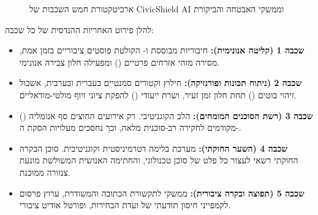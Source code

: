 \begin{figure}[htbp]
\begin{tikzhebrew}
\end{tikzhebrew}
\caption{ארכיטקטורת חמש השכבות של CivicShield AI וממשקי האבטחה והביקורת}
\label{fig:five_layer_arch}
\end{figure}

להלן פירוט האחריות ההנדסית של כל שכבה:
\begin{itemize}
    \item \textbf{שכבה 1 (קליטה אנונימית):} חיבוריות מבוססת  ו- הקולטת פוסטים ציבוריים בזמן אמת, מסירה מזהי אזרחים פרטיים () ומפעילה חלון צבירה אנונימי.
    \item \textbf{שכבה 2 (ניתוח תכונות ופורנזיקה):} חילוץ וקטורים סמנטיים בעברית ובערבית, אשכול זיהוי בוטים () תחת חלון זמן זעיר, ושרת ייעודי () להפקת ציוני זיוף מולטי-מודאליים.
    \item \textbf{שכבה 3 (רשת הסוכנים המומחים):} הלב הקוגניטיבי. רק אירועים החוצים סף אנומליה () מקודמים לחקירה רב-סוכנית מלאה, וכך נחסכים  מעלויות הסקת ה-.
    \item \textbf{שכבה 4 (השער החוקתי):} מערכת בלימה דטרמיניסטית וקוגניטיבית. סוכן הבקרה החוקתי רשאי לעצור כל פלט של סוכן טכנולוגי, והחתימה האנושית המשולשת מונעת צנזורה ממוכנת.
    \item \textbf{שכבה 5 (תפוצה ובקרה ציבורית):} ממשקי  לתקשורת הכתובה והמשודרת, ערוץ פרסום לקמפייני חיסון תודעתי של ועדת הבחירות, ופורטל אודיט ציבורי.
\end{itemize}

